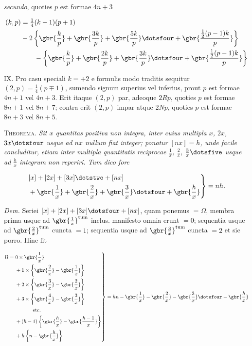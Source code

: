 \emph{secundo}, quoties $p$ est formae $4n+3$

\[
\begin{aligned}
(k,p)&=\tfrac14(k-1)(p+1)\\
& -2\left\{\gbr{\frac{k}{p}}+\gbr{\frac{3k}{p}}+\gbr{\frac{5k}{p}}\dotsfour+\gbr{\frac{\frac12(p-1)k}{p}}\right\}\\
&\qquad-\left\{\gbr{\frac{k}{p}}+\gbr{\frac{2k}{p}}+\gbr{\frac{3k}{p}}\dotsfour+\gbr{\frac{\frac12(p-1)k}{p}}\right\}
\end{aligned}
\]

IX.  Pro casu speciali $k=+2$ e formulis modo traditis sequitur $(2,p)=\tfrac14(p\mp1)$, sumendo signum superius vel inferius, prout $p$ est formae $4n+1$ vel $4n+3$.  Erit itaque $(2,p)$ par, adeoque $2Rp$, quoties $p$ est formae $8n+1$ vel $8n+7$; contra erit $(2,p)$ impar atque $2Np$, quoties $p$ est formae $8n+3$ vel $8n+5$.


\textsc{Theorema.}  \emph{Sit $x$ quantitas positiva non integra, inter cuius multipla $x$, $2x$,} \emph{$3x\dotsfour$ usque ad $nx$ nullum fiat integer; ponatur $[nx]=h$, unde facile concluditur,} \emph{etiam inter multipla quantitatis reciprocae $\frac1x$, $\frac2x$, $\frac3x\dotsfive$ usque ad $\frac hx$ integrum non} \emph{reperiri.  Tum dico fore}

\[
\begin{aligned}
\left.\begin{aligned}
&[x]+[2x]+[3x]\dotstwo+[nx]\\
&+\gbr{\frac1x}+\gbr{\frac2x}+\gbr{\frac3x}\dotsfour+\gbr{\frac hx}
\end{aligned}\right\}=nh.
\end{aligned}
\]

\emph{Dem.}  Seriei $[x]+[2x]+[3x]\dotsfour+[nx]$, quam ponemus $=\Omega$, membra prima usque ad $\gbr{\frac1x}^{\mathrm{tum}}$ inclus. manifesto omnia erunt $=0$; sequentia usque ad $\gbr{\frac2x}^{\mathrm{tum}}$ cuncta $=1$; sequentia usque ad $\gbr{\frac3x}^{\mathrm{tum}}$ cuncta $=2$ et sic porro. Hinc fit

\[
\begin{aligned}
\left.\begin{aligned}
\Omega={}&0\times\gbr{\frac1x}\\
&+1\times\left\{\gbr{\frac2x}-\gbr{\frac1x}\right\}\\
&+2\times\left\{\gbr{\frac3x}-\gbr{\frac2x}\right\}\\
&+3\times\left\{\gbr{\frac4x}-\gbr{\frac3x}\right\}\\
&\hspace{12mm}\text{etc.}\\
&+(h-1)\left\{\gbr{\frac hx}-\gbr{\frac{h-1}{x}}\right\}\\
&+h\left\{n-\gbr{\frac hx}\right\}
\end{aligned}\right\}=hn-\gbr{\frac1x}-\gbr{\frac2x}-\gbr{\frac3x}\dotsfour-\gbr{\frac hx}
\end{aligned}
\]

